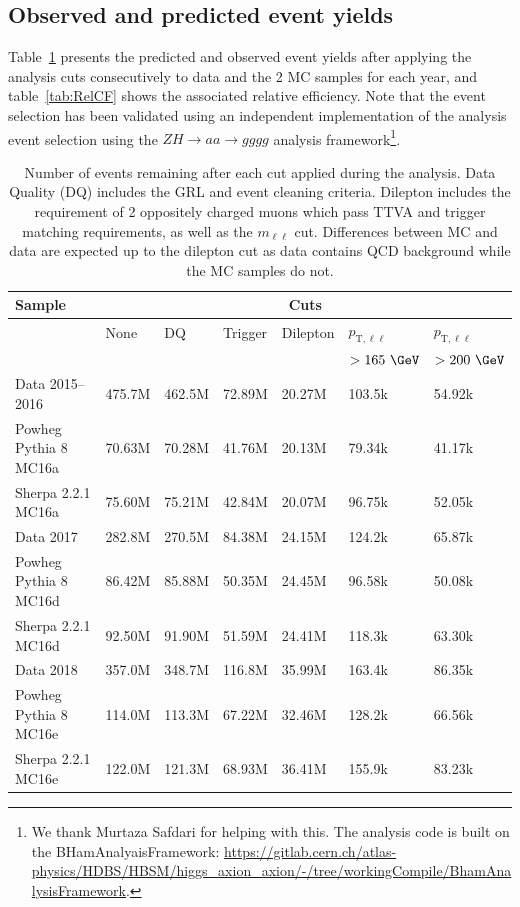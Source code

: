 
\subsection{Observed and predicted event yields}
\label{sec:cutflow}

Table~\ref{tab:CFComp} presents the predicted and observed event yields after applying the analysis cuts consecutively to data and the 2 MC samples for each year, and table~\ref{tab:RelCF} shows the associated relative efficiency.  Note that the event selection has been validated using an independent implementation of the analysis event selection using the $ZH\rightarrow aa\rightarrow gggg$ analysis framework\footnote{We thank Murtaza Safdari for helping with this.  The analysis code is built on the BHamAnalyaisFramework: \url{https://gitlab.cern.ch/atlas-physics/HDBS/HBSM/higgs_axion_axion/-/tree/workingCompile/BhamAnalysisFramework}.}.

\begin{table}[h!]
    \centering
    \begin{tabular}{l|l|l|l|l|l|l}
    \hline\hline
    \textbf{Sample} & \multicolumn{6}{c}{\textbf{Cuts}} \\ \hline
     & None & DQ & Trigger & Dilepton & $p_{\text{T},\ell\ell}$ & $p_{\text{T},\ell\ell}$ \\
     &  &  &  &  & $>165~\GeV$ & $>200~\GeV$ \\ \hline\hline
    Data 2015--2016 & 475.7M & 462.5M & 72.89M & 20.27M & 103.5k & 54.92k \\ \hline
    Powheg Pythia 8 MC16a & 70.63M & 70.28M & 41.76M & 20.13M & 79.34k & 41.17k \\ \hline
    Sherpa 2.2.1 MC16a & 75.60M & 75.21M & 42.84M & 20.07M & 96.75k & 52.05k \\ \hline\hline
    Data 2017 & 282.8M & 270.5M & 84.38M & 24.15M & 124.2k & 65.87k \\ \hline
    Powheg Pythia 8 MC16d & 86.42M & 85.88M & 50.35M & 24.45M & 96.58k & 50.08k \\ \hline
    Sherpa 2.2.1 MC16d & 92.50M & 91.90M & 51.59M & 24.41M & 118.3k & 63.30k \\ \hline\hline
    Data 2018 & 357.0M & 348.7M & 116.8M & 35.99M & 163.4k & 86.35k \\ \hline
    Powheg Pythia 8 MC16e & 114.0M & 113.3M & 67.22M & 32.46M & 128.2k & 66.56k \\ \hline
    Sherpa 2.2.1 MC16e & 122.0M & 121.3M & 68.93M & 36.41M & 155.9k & 83.23k \\ \hline\hline
    \end{tabular}
    \caption{Number of events remaining after each cut applied during the analysis. Data Quality (DQ) includes the GRL and event cleaning criteria.
    Dilepton includes the requirement of 2 oppositely charged muons which pass TTVA and trigger matching requirements, as well as the $m_{\ell\ell}$ cut.
    Differences between MC and data are expected up to the dilepton cut as data contains QCD background while the MC samples do not.}
    \label{tab:CFComp}
\end{table}

